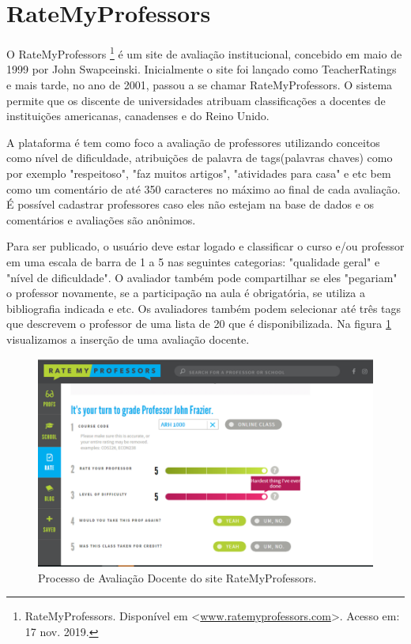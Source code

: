 \documentclass[12pt, a4paper]{report}
\begin{document}
\section{RateMyProfessors}
O RateMyProfessors \footnote{RateMyProfessors. Disponível em <\url{www.ratemyprofessors.com}>. Acesso em: 17 nov. 2019.} é um site de avaliação institucional, concebido em maio de 1999 por John Swapceinski. Inicialmente o site foi lançado como TeacherRatings e mais tarde, no ano de 2001, passou a se chamar RateMyProfessors. O sistema permite que os discente de universidades atribuam classificações a docentes de instituições americanas, canadenses e do Reino Unido.

A plataforma é tem como foco a avaliação de professores utilizando conceitos como nível de dificuldade, atribuições de palavra de tags(palavras chaves) como por exemplo "respeitoso", "faz muitos artigos", "atividades para casa" e etc bem como um comentário de até 350 caracteres no máximo ao final de cada avaliação. É possível cadastrar professores caso eles não estejam na base de dados e os comentários e avaliações são anônimos.

Para ser publicado, o usuário deve estar logado e classificar o curso e/ou professor em uma escala de barra de 1 a 5 nas seguintes categorias: "qualidade geral" e "nível de dificuldade". O avaliador também pode compartilhar se eles "pegariam" o professor novamente, se a participação na aula é obrigatória, se utiliza a bibliografia indicada e etc. Os avaliadores também podem selecionar até três tags que descrevem o professor de uma lista de 20 que é disponibilizada. Na figura \ref{fig:ratemyprofessor} visualizamos a inserção de uma avaliação docente.

\begin{figure}
\centering
\includegraphics[scale=0.45]{ratemyprofessor.png}
\caption{Processo de Avaliação Docente do site RateMyProfessors.}
\label{fig:ratemyprofessor}
\end{figure}
\end{document}
